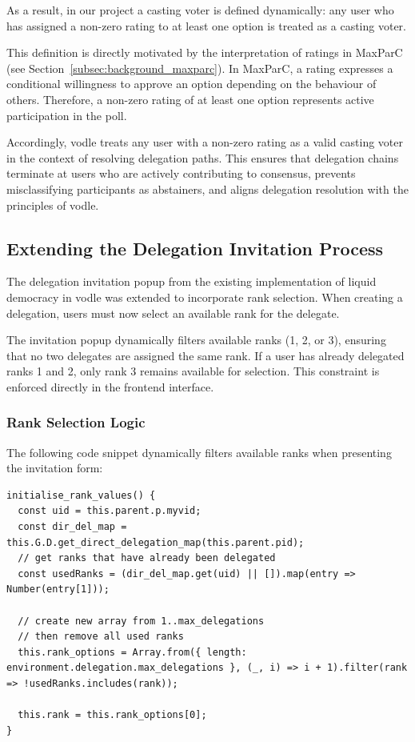 As a result, in our project a casting voter is defined dynamically: any user who has assigned a non-zero rating to at least one option is treated as a casting voter.

This definition is directly motivated by the interpretation of ratings in MaxParC (see Section~\ref{subsec:background_maxparc}). In MaxParC, a rating expresses a conditional willingness to approve an option depending on the behaviour of others. Therefore, a non-zero rating of at least one option represents active participation in the poll.

Accordingly, vodle treats any user with a non-zero rating as a valid casting voter in the context of resolving delegation paths. This ensures that delegation chains terminate at users who are actively contributing to consensus, prevents misclassifying participants as abstainers, and aligns delegation resolution with the principles of vodle. 

\subsection{Extending the Delegation Invitation Process}

The delegation invitation popup from the existing implementation of liquid democracy in vodle was extended to incorporate rank selection. When creating a delegation, users must now select an available rank for the delegate.

The invitation popup dynamically filters available ranks (1, 2, or 3), ensuring that no two delegates are assigned the same rank. If a user has already delegated ranks 1 and 2, only rank 3 remains available for selection. This constraint is enforced directly in the frontend interface.

\subsubsection{Rank Selection Logic}

The following code snippet dynamically filters available ranks when presenting the invitation form:

\begin{verbatim}
initialise_rank_values() {
  const uid = this.parent.p.myvid;
  const dir_del_map = this.G.D.get_direct_delegation_map(this.parent.pid);
  // get ranks that have already been delegated
  const usedRanks = (dir_del_map.get(uid) || []).map(entry => Number(entry[1]));

  // create new array from 1..max_delegations
  // then remove all used ranks
  this.rank_options = Array.from({ length: environment.delegation.max_delegations }, (_, i) => i + 1).filter(rank => !usedRanks.includes(rank));

  this.rank = this.rank_options[0];
}
\end{verbatim}

